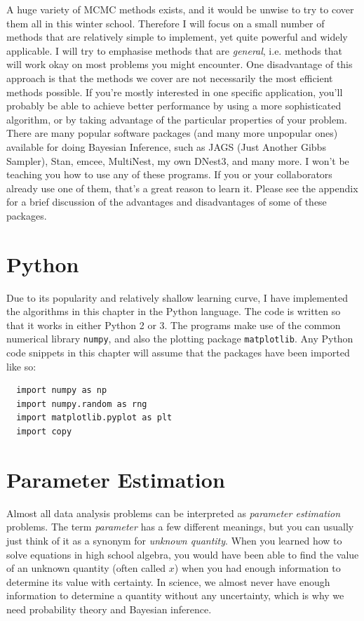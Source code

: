 A huge variety of MCMC methods exists, and it would be
unwise to try to cover them all in this winter school. Therefore I will focus
on a small number of methods that are relatively simple to implement, yet quite powerful
and widely applicable. I will try to emphasise methods that are {\it general},
i.e. methods that will work okay on most problems you might encounter. One
disadvantage of this approach is that the methods we cover are not necessarily
the most efficient methods possible. If you're mostly interested in one
specific application, you'll probably be able to achieve better performance
by using a more sophisticated algorithm, or by taking advantage of the particular
properties of your problem.
There are many popular software packages (and many more unpopular ones)
available for doing Bayesian Inference, such as JAGS (Just Another Gibbs Sampler),
Stan, emcee, MultiNest, my own DNest3, and many more.
I won't be teaching you how to use any of these programs.
If you or your collaborators already use one of them, that's a great reason to
learn it. Please see the appendix for a brief discussion of the advantages and
disadvantages of some of these packages.


\section{Python}
Due to its popularity and relatively shallow learning curve,
I have implemented the algorithms in this chapter in the Python language.
The code is written so that it works in either Python 2 or 3.
The programs make use of the common numerical library {\tt numpy}, and also
the plotting package {\tt matplotlib}. Any Python code snippets in this chapter
will assume that the packages have been imported like so:

\begin{verbatim}
  import numpy as np
  import numpy.random as rng
  import matplotlib.pyplot as plt
  import copy
\end{verbatim}



\section{Parameter Estimation}
Almost all data analysis problems can be interpreted as {\it parameter
estimation} problems. The term {\it parameter} has a few different meanings,
but you can usually just think of it as a synonym for {\it unknown quantity}.
When you learned how to solve equations in high school algebra,
you would have been able to find the value of an unknown quantity
(often called $x$) when you had
enough information to determine its value with certainty.
In science, we almost never have enough information to determine a quantity
without any uncertainty, which is why we need probability theory and Bayesian
inference.

